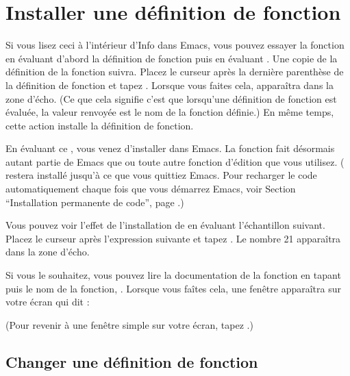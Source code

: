 \section{Installer une définition de fonction}

Si vous lisez ceci à l'intérieur d'Info dans Emacs, vous pouvez
essayer la fonction  en évaluant d'abord la
définition de fonction puis en évaluant . Une copie de la définition de la fonction suivra. Placez le
curseur après la dernière parenthèse de la définition de fonction et
tapez . Lorsque vous faites cela, 
apparaîtra dans la zone d'écho. (Ce que cela signifie c'est que
lorsqu'une définition de fonction est évaluée, la valeur renvoyée est
le nom de la fonction définie.) En même temps, cette action installe
la définition de fonction. 




En évaluant ce , vous venez d'installer
 dans Emacs. La fonction fait désormais autant
partie de Emacs que  ou toute autre fonction
d'édition que vous utilisez. ( restera installé
jusqu'à ce que vous quittiez Emacs. Pour recharger le code
automatiquement chaque fois que vous démarrez Emacs, voir Section
 ``Installation permanente de code'', page .)

Vous pouvez voir l'effet de l'installation de 
en évaluant l'échantillon suivant. Placez le curseur après
l'expression suivante et tapez . Le nombre 21 apparaîtra
dans la zone d'écho.


Si vous le souhaitez, vous pouvez lire la documentation de la fonction
en tapant  puis le nom de la fonction,
. Lorsque vous faîtes cela, une fenêtre
 apparaîtra sur votre écran qui dit :




(Pour revenir à une fenêtre simple sur votre écran, tapez .)
 
\subsection{Changer une définition de fonction}

